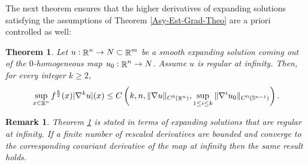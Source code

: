 \documentclass[a4paper,11pt,reqno]{amsart}
\newtheorem{theo}[defn]{Theorem}
\newtheorem{rk}[defn]{Remark}
\def\R{\mathop{\rm \mathbb{R}}\nolimits}
\begin{document}
The next theorem ensures that the higher derivatives of expanding solutions satisfying the assumptions of Theorem \ref{Asy-Est-Grad-Theo} are a priori controlled as well:
\begin{theo}\label{theo-high-der-a-priori}
Let $u:\R^n\rightarrow N\subset \R^m$ be a smooth expanding solution coming out of the $0$-homogeneous map $u_0:\R^n\rightarrow N$. Assume $u$ is regular at infinity. Then, for every integer $k\geq 2$,
\begin{eqnarray}
\sup_{x\in\R^n}f^{\frac{k}{2}}(x)|\nabla^k u|(x)\leq C\left(k,n,\|\nabla u\|_{C^0(\R^n)},\sup_{1\leq i\leq k}\|\nabla ^iu_0\|_{C^0(\mathbb{S}^{n-1})}\right).\label{a-priori-bdy-inf-der}
\end{eqnarray}

\end{theo}

\begin{rk}\label{rk-theo-high-der-a-priori}
Theorem \ref{theo-high-der-a-priori} is stated in terms of expanding solutions that are regular at infinity. If a finite number of rescaled derivatives are bounded and converge to the corresponding covariant derivative of the map at infinity then the same result holds.
\end{rk}
\end{document}

